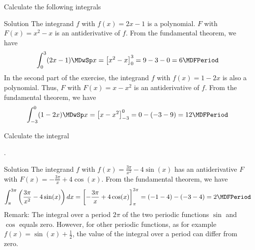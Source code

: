 \begin{MExercises}
\begin{MExercise}
Calculate the following integrals
\begin{MExerciseItems}
\item{}
\item{}
\end{MExerciseItems}

\begin{MHint}{Solution}
The integrand $f$ with $f(x) = 2 x - 1$ is a polynomial. $F$ with $F(x) = x^2 - x$ is an antiderivative of $f$. From the fundamental theorem, we have
\[
 \int_{0}^{3} (2 x - 1) \MDwSp x %
 = \left[ x^2 - x \right]_{0}^{3} %
 = 9 - 3 - 0%
 = 6 \MDFPeriod %
\]
In the second part of the exercise, the integrand $f$ with $f(x) = 1 - 2 x$ is 
also a polynomial. Thus, $F$ with $F(x) = x - x^2$ is an antiderivative of $f$. From the fundamental 
theorem, we have
\[
 \int_{-3}^{0} (1 - 2 x) \MDwSp x %
 = \left[ x - x^2 \right]_{-3}^{0} %
 = 0 - (-3 - 9)%
 = 12 \MDFPeriod %
\]
\end{MHint}
\end{MExercise}

\begin{MExercise}
Calculate the integral

.

\begin{MHint}{Solution}
The integrand $f$ with $f(x) = \frac{3 \pi}{x^2} - 4 \sin(x)$ has an antiderivative $F$ with
$F(x) = -\frac{3 \pi}{x} + 4 \cos(x)$. From the fundamental 
theorem, we have
\[
 \int_{\pi}^{3 \pi} \left(\frac{3 \pi}{x^2} - 4 \sin(x)\right) \MD x %
 = \left[ -\frac{3 \pi}{x} + 4 \cos(x) \right]_{\pi}^{3 \pi} %
 = ( -1 - 4 ) - ( -3 - 4 )%
 = 2 \MDFPeriod %
\]
Remark: The integral over a period $2 \pi$ of the two periodic functions $\sin$ and $\cos$ equals zero. 
However, for other periodic functions, as for example $f(x) = \sin(x) + \frac{1}{2}$, 
the value of the integral over a period can differ from zero. 
\end{MHint}
\end{MExercise}

\end{MExercises}




